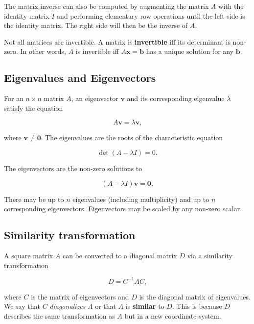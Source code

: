The matrix inverse can also be computed by augmenting the matrix $A$ with the identity matrix $I$ and performing elementary row operations until the left side is the identity matrix. The right side will then be the inverse of $A$.

Not all matrices are invertible. A matrix is \textbf{invertible} iff its determinant is non-zero. In other words, $A$ is invertible iff $A\mathbf{x} = \mathbf{b}$ has a unique solution for any $\mathbf{b}$.

\subsection{Eigenvalues and Eigenvectors}

For an $n\times n$ matrix $A$, an eigenvector $\mathbf{v}$ and its corresponding eigenvalue $\lambda$ satisfy the equation

\begin{equation*}
    A\mathbf{v} = \lambda\mathbf{v}\text{,}
\end{equation*}

where $\mathbf{v} \neq \mathbf{0}$. The eigenvalues are the roots of the characteristic equation

\begin{equation*}
    \det(A - \lambda I) = 0\text{.}
\end{equation*}

The eigenvectors are the non-zero solutions to

\begin{equation*}
    (A - \lambda I)\mathbf{v} = \mathbf{0}\text{.}
\end{equation*}

There may be up to $n$ eigenvalues (including multiplicity) and up to $n$ corresponding eigenvectors. Eigenvectors may be scaled by any non-zero scalar.

\subsection{Similarity transformation}

A square matrix $A$ can be converted to a diagonal matrix $D$ via a similarity transformation

\begin{equation*}
    D = C^{-1}AC\text{,}
\end{equation*}

where $C$ is the matrix of eigenvectors and $D$ is the diagonal matrix of eigenvalues. We say that $C$ \emph{diagonalizes} $A$ or that $A$ is \textbf{similar} to $D$. This is because $D$ describes the same transformation as $A$ but in a new coordinate system.


